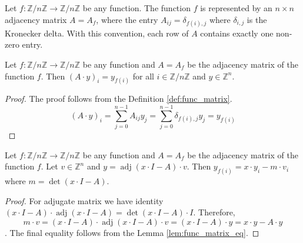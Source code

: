%

\begin{definition}
\label{def:func_matrix}
\leanok
Let $f: \mathbb{Z}/n\mathbb{Z} \to \mathbb{Z}/n\mathbb{Z}$ be any function. The function $f$ is represented by an 
$n \times n$ adjacency matrix $A=A_f$, where the entry 
$A_{ij} = \delta_{f(i),j}$ 
where $\delta_{i,j}$ is the Kronecker delta.
With this convention, each row of $A$ contains exactly one non-zero entry.
\end{definition}

\begin{lemma}
\label{lem:func_matrix_eq}
\leanok
Let $f: \mathbb{Z}/n\mathbb{Z} \to \mathbb{Z}/n\mathbb{Z}$ be any function and $A=A_f$ be the adjacency matrix of the function $f$. 
Then $(A\cdot y)_i = y_{f(i)}$ for all $i\in \mathbb{Z}/n\mathbb{Z}$ and $y\in \mathbb{Z}^n$.
\end{lemma}

\begin{proof}
The proof follows from the Definition \ref{def:func_matrix}.
$$(A\cdot y)_i = \sum_{j=0}^{n-1} A_{ij} y_j = \sum_{j=0}^{n-1} \delta_{f(i),j} y_j = y_{f(i)}$$
\end{proof}

\begin{lemma}
\label{lem:adj_eq}
\leanok
Let $f: \mathbb{Z}/n\mathbb{Z} \to \mathbb{Z}/n\mathbb{Z}$ be any function and $A=A_f$ be the adjacency matrix of the function $f$. 
Let $v\in \mathbb{Z}^n$ and $y = \operatorname{adj}(x\cdot I - A)\cdot v$. 
Then $y_{f(i)} = x\cdot y_i - m\cdot v_i$ where $m = \det(x\cdot I - A)$.
\end{lemma}

\begin{proof}
For adjugate matrix we have identity 
$(x\cdot I - A)\cdot \operatorname{adj} (x\cdot I - A) = \det(x\cdot I - A)\cdot I$.
Therefore,
$$m\cdot v = (x\cdot I - A)\cdot \operatorname{adj} (x\cdot I - A)\cdot v 
= (x\cdot I - A)\cdot y = x\cdot y - A\cdot y$$.
The final equality follows from the Lemma \ref{lem:func_matrix_eq}.
\end{proof}

